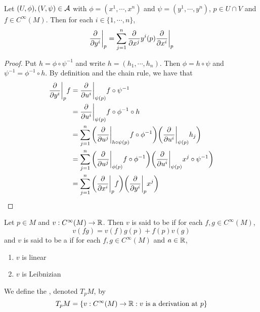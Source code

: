 \documentclass{book}
\begin{document}
	\begin{ex} \\
		Let $(U, \phi), (V, \psi) \in \mathcal{A}$ with $\phi = (x^1, \cdots, x^n)$ and $\psi = (y^1, \cdots, y^n)$, $p \in U \cap V$ and $f \in C^{\infty}(M)$. Then for each $i \in \{1, \cdots, n\}$, 
		 $$\frac{\partial}{\partial y^i} \bigg|_p = \sum_{j =1}^n {\frac{\partial}{\partial x^j}{y^i}}(p) \frac{\partial}{\partial x^i} \bigg|_p    $$
	\end{ex}

	\begin{proof}
		Put $h = \phi \circ \psi^{-1}$ and write $h = (h_1, \cdots, h_n)$. Then $\phi = h \circ \psi$ and $\psi^{-1} = \phi^{-1} \circ h$. By definition and the chain rule, we have that 
		\begin{align*}
		\frac{\partial}{\partial y^i} \bigg|_p f 
			&= \frac{\partial}{\partial u^i} \bigg|_{\psi(p)} f \circ \psi^{-1} \\
			&= \frac{\partial}{\partial u^i} \bigg|_{\psi(p)} f \circ \phi^{-1} \circ h \\
			&= \sum_{j=1}^n \bigg(\frac{\partial}{\partial u^j} \bigg|_{h \circ \psi (p)} f \circ \phi^{-1} \bigg)  \bigg( \frac{\partial}{\partial u^i} \bigg|_{\psi(p)} h_j \bigg) \\
			&= \sum_{j=1}^n \bigg(\frac{\partial}{\partial u^j} \bigg|_{\phi (p)} f \circ \phi^{-1}  \bigg) \bigg( \frac{\partial}{\partial u^i} \bigg|_{\psi(p)} x^j \circ \psi^{-1} \bigg) \\
			&= \sum_{j=1}^n \bigg( \frac{\partial}{\partial x^i} \bigg|_p f \bigg)  \bigg(   \frac{\partial}{\partial y^i} \bigg|_p x^j  \bigg)\\
		\end{align*}
	\end{proof}

	\begin{defn}
		Let $p \in M$ and $v: C^{\infty}(M) \rightarrow \mathbb{R}$. Then $v$ is said to be  if for each $f,g \in  C^{\infty}(M)$, $$v(fg) = v(f)g(p) + f(p)v(g)$$ and $v$ is said to be a  if for each $f, g \in C^{\infty}(M)$ and $a \in \mathbb{R}$,
		\begin{enumerate}
			\item $v$ is linear 
			\item $v$ is Leibnizian
		\end{enumerate}
		We define the , denoted $T_pM$, by $$T_pM = \{ v: C^{\infty}(M) \rightarrow \mathbb{R}: v \text{ is a derivation at }p\}$$
	\end{defn}

	\begin{ex}
	\end{ex}
\end{document}

